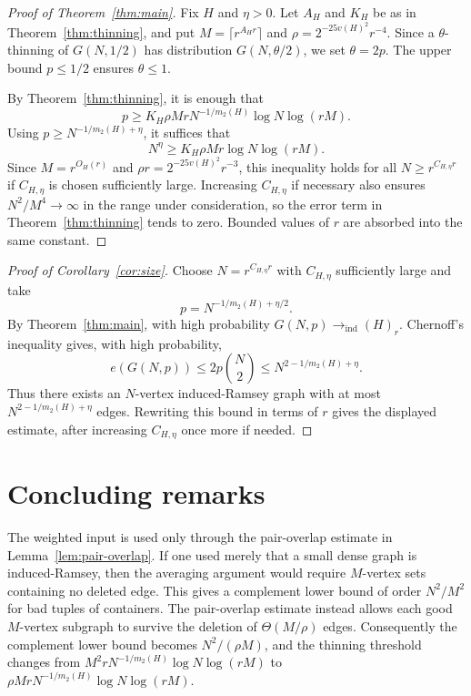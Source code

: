 \documentclass[11pt,reqno]{amsart}
\numberwithin{equation}{section}
\theoremstyle{plain}
\theoremstyle{definition}
\newcommand{\ind}{\mathrm{ind}}
\begin{document}
\begin{proof}[Proof of Theorem~\ref{thm:main}]
Fix $H$ and $\eta>0$.  Let $A_H$ and $K_H$ be as in
Theorem~\ref{thm:thinning}, and put $M=\lceil r^{A_Hr}\rceil$ and
$\rho=2^{-25v(H)^2}r^{-4}$.  Since a $\theta$-thinning of $G(N,1/2)$ has
distribution $G(N,\theta/2)$, we set $\theta=2p$.  The upper bound
$p\le1/2$ ensures $\theta\le1$.

By Theorem~\ref{thm:thinning}, it is enough that
$$
        p\ge K_H\rho MrN^{-1/m_2(H)}\log N\log(rM).
$$
Using $p\ge N^{-1/m_2(H)+\eta}$, it suffices that
$$
        N^\eta\ge K_H\rho Mr\log N\log(rM).
$$
Since $M=r^{O_H(r)}$ and $\rho r=2^{-25v(H)^2}r^{-3}$, this inequality
holds for all $N\ge r^{C_{H,\eta}r}$ if $C_{H,\eta}$ is chosen sufficiently
large.  Increasing $C_{H,\eta}$ if necessary also ensures $N^2/M^4\to
\infty$ in the range under consideration, so the error term in
Theorem~\ref{thm:thinning} tends to zero.  Bounded values of $r$ are absorbed into
the same constant.
\end{proof}

\begin{proof}[Proof of Corollary~\ref{cor:size}]
Choose $N=r^{C_{H,\eta}r}$ with $C_{H,\eta}$ sufficiently large and take
$$
        p=N^{-1/m_2(H)+\eta/2}.
$$
By Theorem~\ref{thm:main}, with high probability
$G(N,p)\to_{\ind}(H)_r$.  Chernoff's inequality gives, with high probability,
$$
        e(G(N,p))\le 2p\binom N2\le N^{2-1/m_2(H)+\eta}.
$$
Thus there exists an $N$-vertex induced-Ramsey graph with at most
$N^{2-1/m_2(H)+\eta}$ edges.  Rewriting this bound in terms of $r$ gives
the displayed estimate, after increasing $C_{H,\eta}$ once more if needed.
\end{proof}

\section{Concluding remarks}

The weighted input is used only through the pair-overlap estimate in
Lemma~\ref{lem:pair-overlap}.  If one used merely that a small dense graph is
induced-Ramsey, then the averaging argument would require $M$-vertex sets
containing no deleted edge.  This gives a complement lower bound of order
$N^2/M^2$ for bad tuples of containers.  The pair-overlap estimate instead
allows each good $M$-vertex subgraph to survive the deletion of
$\Theta(M/\rho)$ edges.  Consequently the complement lower bound becomes
$N^2/(\rho M)$, and the thinning threshold changes from
$M^2rN^{-1/m_2(H)}\log N\log(rM)$ to $\rho MrN^{-1/m_2(H)}\log N\log(rM)$.
\end{document}
